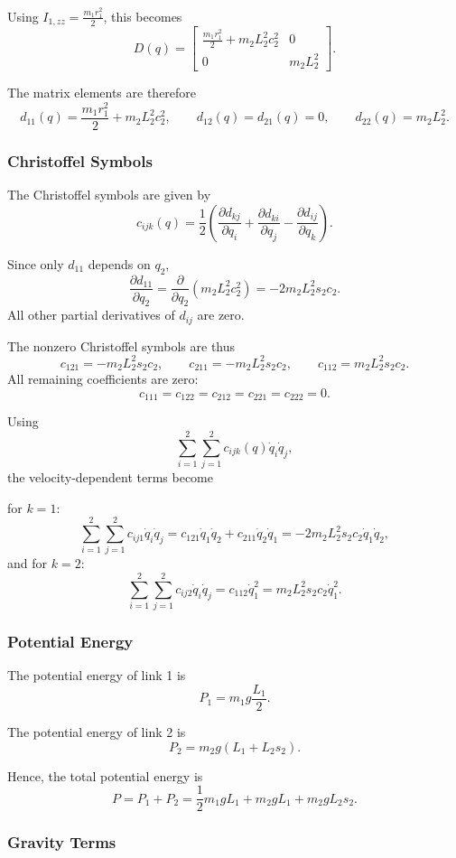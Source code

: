 \documentclass{article}
\begin{document}
Using \(I_{1,zz}=\frac{m_1r_1^2}{2}\), this becomes
\[
D(q)
=
\begin{bmatrix}
\frac{m_1r_1^2}{2} + m_2L_2^2 c_2^2 & 0\\
0 & m_2L_2^2
\end{bmatrix}.
\]

The matrix elements are therefore
\[
d_{11}(q)=\frac{m_1r_1^2}{2} + m_2L_2^2 c_2^2,
\qquad
d_{12}(q)=d_{21}(q)=0,
\qquad
d_{22}(q)=m_2L_2^2.
\]

\subsubsection*{Christoffel Symbols}

The Christoffel symbols are given by
\[
c_{ijk}(q)
=
\frac{1}{2}
\left(
\frac{\partial d_{kj}}{\partial q_i}
+
\frac{\partial d_{ki}}{\partial q_j}
-
\frac{\partial d_{ij}}{\partial q_k}
\right).
\]

Since only \(d_{11}\) depends on \(q_2\),
\[
\frac{\partial d_{11}}{\partial q_2}
=
\frac{\partial}{\partial q_2}\left(m_2L_2^2 c_2^2\right)
=
-2m_2L_2^2 s_2 c_2.
\]
All other partial derivatives of \(d_{ij}\) are zero.

The nonzero Christoffel symbols are thus
\[
c_{121} = -m_2L_2^2 s_2 c_2,
\qquad
c_{211} = -m_2L_2^2 s_2 c_2,
\qquad
c_{112} = m_2L_2^2 s_2 c_2.
\]
All remaining coefficients are zero:
\[
c_{111}=c_{122}=c_{212}=c_{221}=c_{222}=0.
\]

Using
\[
\sum_{i=1}^{2}\sum_{j=1}^{2} c_{ijk}(q)\dot q_i \dot q_j,
\]
the velocity-dependent terms become

for \(k=1\):
\[
\sum_{i=1}^{2}\sum_{j=1}^{2} c_{ij1}\dot q_i \dot q_j
=
c_{121}\dot q_1\dot q_2 + c_{211}\dot q_2\dot q_1
=
-2m_2L_2^2 s_2 c_2 \dot q_1\dot q_2,
\]
and for \(k=2\):
\[
\sum_{i=1}^{2}\sum_{j=1}^{2} c_{ij2}\dot q_i \dot q_j
=
c_{112}\dot q_1^2
=
m_2L_2^2 s_2 c_2 \dot q_1^2.
\]

\subsubsection*{Potential Energy}

The potential energy of link 1 is
\[
P_1 = m_1 g \frac{L_1}{2}.
\]

The potential energy of link 2 is
\[
P_2 = m_2 g (L_1 + L_2 s_2).
\]

Hence, the total potential energy is
\[
P = P_1 + P_2
=
\frac{1}{2}m_1 g L_1 + m_2 g L_1 + m_2 g L_2 s_2.
\]

\subsubsection*{Gravity Terms}
\end{document}
